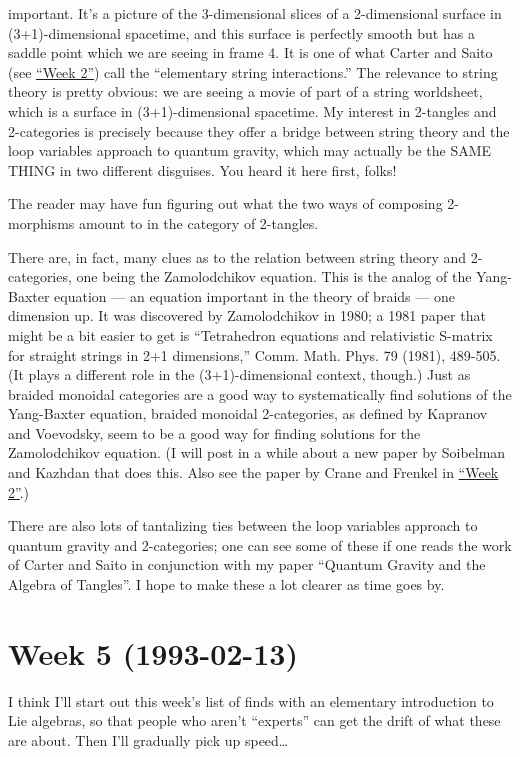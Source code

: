 \documentclass{article}
\begin{document}
important. It's a picture of the 3-dimensional slices of a 2-dimensional
surface in (3+1)-dimensional spacetime, and this surface is perfectly
smooth but has a saddle point which we are seeing in frame 4. It is one
of what Carter and Saito (see \protect\hyperlink{week2}{``Week 2''})
call the ``elementary string interactions.'' The relevance to string
theory is pretty obvious: we are seeing a movie of part of a string
worldsheet, which is a surface in (3+1)-dimensional spacetime. My
interest in 2-tangles and 2-categories is precisely because they offer a
bridge between string theory and the loop variables approach to quantum
gravity, which may actually be the SAME THING in two different
disguises. You heard it here first, folks!

The reader may have fun figuring out what the two ways of composing
2-morphisms amount to in the category of 2-tangles.

There are, in fact, many clues as to the relation between string theory
and 2-categories, one being the Zamolodchikov equation. This is the
analog of the Yang-Baxter equation --- an equation important in the
theory of braids --- one dimension up. It was discovered by
Zamolodchikov in 1980; a 1981 paper that might be a bit easier to get is
``Tetrahedron equations and relativistic S-matrix for straight strings
in 2+1 dimensions,'' Comm. Math. Phys. 79 (1981), 489-505. (It plays a
different role in the (3+1)-dimensional context, though.) Just as
braided monoidal categories are a good way to systematically find
solutions of the Yang-Baxter equation, braided monoidal 2-categories, as
defined by Kapranov and Voevodsky, seem to be a good way for finding
solutions for the Zamolodchikov equation. (I will post in a while about
a new paper by Soibelman and Kazhdan that does this. Also see the paper
by Crane and Frenkel in \protect\hyperlink{week2}{``Week 2''}.)

There are also lots of tantalizing ties between the loop variables
approach to quantum gravity and 2-categories; one can see some of these
if one reads the work of Carter and Saito in conjunction with my paper
``Quantum Gravity and the Algebra of Tangles''. I hope to make these a
lot clearer as time goes by.
\hypertarget{week5}{%
\section{Week 5 (1993-02-13)}\label{week5}}

I think I'll start out this week's list of finds with an elementary
introduction to Lie algebras, so that people who aren't ``experts'' can
get the drift of what these are about. Then I'll gradually pick up
speed\ldots{}
\end{document}
